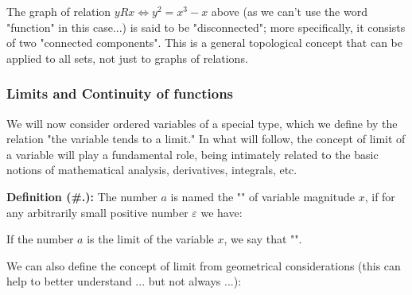 	The graph of relation $y R x\Leftrightarrow y^2=x^3-x$ above (as we can't use the word "function" in this case...) is said to be "disconnected"; more specifically, it consists of two "connected components". This is a general topological concept that can be applied to all sets, not just to graphs of relations.
	
	\pagebreak
	\subsubsection{Limits and Continuity of functions}\label{limits}
	We will now consider ordered variables of a special type, which we define by the relation "the variable tends to a limit." In what will follow, the concept of limit of a variable will play a fundamental role, being intimately related to the basic notions of mathematical analysis, derivatives, integrals, etc.
	
	\textbf{Definition (\#\thesection.\mydef):} The number $a$ is named the "" of variable magnitude $x$, if for any arbitrarily small positive number $\varepsilon$ we have:
	
	If the number $a$ is the limit of the variable $x$, we say that "".

	We can also define the concept of limit from geometrical considerations (this can help to better understand ... but not always ...):
	
